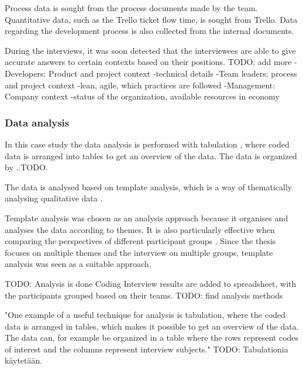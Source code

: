 \documentclass[english]{tktltiki2}
\theoremstyle{definition}
\theoremstyle{remark}
\begin{document}
Process data is sought from the process documents made by the team. Quantitative data, such as the Trello ticket flow time, is sought from Trello. Data regarding the development process is also collected from the internal documents.

During the interviews, it was soon detected that the interviewees are able to give accurate answers to certain contexts based on their positions. TODO: add more
-Developers: Product and project context
   -technical details
-Team leaders: process and project context
   -lean, agile, which practices are followed
-Management: Company context
   -status of the organization, available resources in economy

\subsubsection{Data analysis} %
In this case study the data analysis is performed with tabulation \cite{runeson2009guidelines}, where coded data is arranged into tables to get an overview of the data. The data is organized by ..TODO.

The data is analysed based on template analysis, which is a way of thematically analysing qualitative data \cite{king1998template}.

Template analysis was chosen as an analysis approach because it organises and analyses the data according to themes. It is also particularly effective when comparing the perspectives of different participant groups \cite{king2004using}. Since the thesis focuses on multiple themes and the interview on multiple groups, template analysis was seen as a suitable approach.   


TODO: Analysis is done \cite{runeson2009guidelines}
Coding
Interview results are added to spreadsheet, with the participants grouped based on their teams. TODO: find analysis methods

"One example of a useful technique for analysis is tabulation, where the coded data is arranged in tables, which makes it possible to get an overview of the data. The data can, for example be organized in a table where the rows represent codes of interest and the columns represent interview subjects." \cite{runeson2009guidelines} TODO: Tabulationia käytetään.
\end{document}
